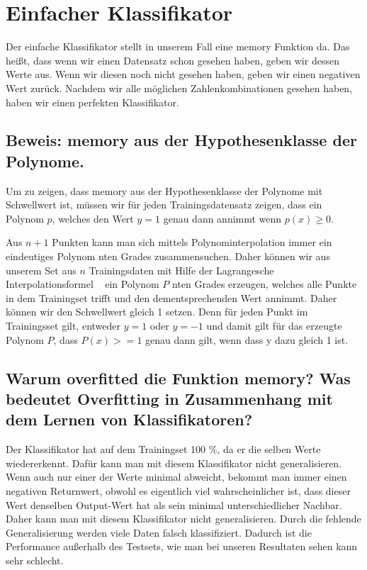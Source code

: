 \section{Einfacher Klassifikator}
\label{ch:implementation}

Der einfache Klassifikator stellt in unserem Fall eine memory Funktion da. Das heißt, dass wenn wir einen Datensatz schon gesehen haben, geben wir dessen Werte aus. Wenn wir diesen noch nicht gesehen haben, geben wir einen negativen Wert zurück. Nachdem wir alle möglichen Zahlenkombinationen gesehen haben, haben wir einen perfekten Klassifikator. 

\subsection{Beweis: memory aus der Hypothesenklasse der Polynome.}

Um zu zeigen, dass memory aus der Hypothesenklasse der Polynome mit Schwellwert ist, müssen wir für jeden Trainingsdatensatz zeigen, dass ein Polynom $p$, welches den Wert $y = 1$ genau dann annimmt wenn $p(x) \ge 0$. 

Aus $n + 1$ Punkten kann man sich mittels Polynominterpolation immer ein eindeutiges Polynom nten Grades zusammensuchen. Daher können wir aus unserem Set aus $n$ Trainingsdaten mit Hilfe der Lagrangesche Interpolationsformel ~\cite{norlund2013vorlesungen} ein Polynom $P$ nten Grades erzeugen, welches alle Punkte in dem Trainingset trifft und den dementsprechenden Wert annimmt. Daher können wir den Schwellwert gleich 1 setzen. Denn für jeden Punkt im Trainingsset gilt, entweder $y = 1$ oder $y = -1$ und damit gilt für das erzeugte Polynom $P$, dass $P(x) >= 1$ genau dann gilt, wenn dass y dazu gleich 1 ist.



\subsection{Warum overfitted die Funktion memory? Was bedeutet Overfitting in Zusammenhang mit dem Lernen von Klassifikatoren?} 

Der Klassifikator hat auf dem Trainingset 100 \%, da er die selben Werte wiedererkennt. Dafür kann man mit diesem Klassifikator nicht generalisieren. Wenn auch nur einer der Werte minimal abweicht, bekommt man immer einen negativen Returnwert, obwohl es eigentlich viel wahrscheinlicher ist, dass dieser Wert denselben Output-Wert hat als sein minimal unterschiedlicher Nachbar. Daher kann man mit diesem Klassifikator nicht generalisieren. Durch die fehlende Generalisierung werden viele Daten falsch klassifiziert. Dadurch ist die Performance außerhalb des Testsets, wie man bei unseren Resultaten sehen kann sehr schlecht. 


